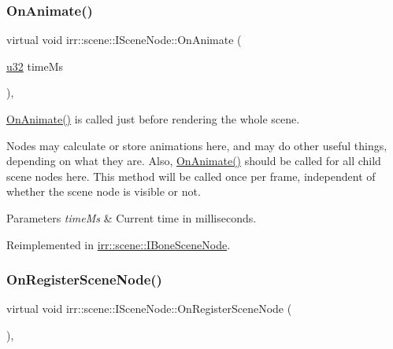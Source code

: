 \subsubsection{\texorpdfstring{On\+Animate()}{OnAnimate()}}
{\footnotesize\ttfamily virtual void irr\+::scene\+::\+I\+Scene\+Node\+::\+On\+Animate (\begin{DoxyParamCaption}\item[{\hyperlink{namespaceirr_a0416a53257075833e7002efd0a18e804}{u32}}]{time\+Ms }\end{DoxyParamCaption})\hspace{0.3cm}{\ttfamily [inline]}, {\ttfamily [virtual]}}



\hyperlink{classirr_1_1scene_1_1ISceneNode_afc1dcb5cb19116d0c7aa3d4ebdf04cc5}{On\+Animate()} is called just before rendering the whole scene. 

Nodes may calculate or store animations here, and may do other useful things, depending on what they are. Also, \hyperlink{classirr_1_1scene_1_1ISceneNode_afc1dcb5cb19116d0c7aa3d4ebdf04cc5}{On\+Animate()} should be called for all child scene nodes here. This method will be called once per frame, independent of whether the scene node is visible or not. 
\begin{DoxyParams}{Parameters}
{\em time\+Ms} & Current time in milliseconds. \\
\hline
\end{DoxyParams}


Reimplemented in \hyperlink{classirr_1_1scene_1_1IBoneSceneNode_a7e21d0722e5b105e4d2a956bff110a7f}{irr\+::scene\+::\+I\+Bone\+Scene\+Node}.

\mbox{\label{classirr_1_1scene_1_1ISceneNode_ac9795bfcb88dcaf8cba6ea3296e5d8d0}} 
\subsubsection{\texorpdfstring{On\+Register\+Scene\+Node()}{OnRegisterSceneNode()}}
{\footnotesize\ttfamily virtual void irr\+::scene\+::\+I\+Scene\+Node\+::\+On\+Register\+Scene\+Node (\begin{DoxyParamCaption}{ }\end{DoxyParamCaption})\hspace{0.3cm}{\ttfamily [inline]}, {\ttfamily [virtual]}}



